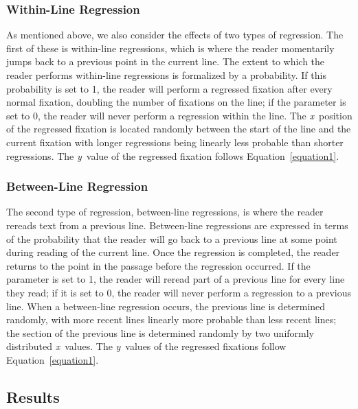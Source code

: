 \documentclass[doc,biblatex]{apa7}
\begin{document}
\subsubsection{Within-Line Regression}

As mentioned above, we also consider the effects of two types of regression. The first of these is within-line regressions, which is where the reader momentarily jumps back to a previous point in the current line. The extent to which the reader performs within-line regressions is formalized by a probability. If this probability is set to 1, the reader will perform a regressed fixation after every normal fixation, doubling the number of fixations on the line; if the parameter is set to 0, the reader will never perform a regression within the line. The \textit{x}~position of the regressed fixation is located randomly between the start of the line and the current fixation with longer regressions being linearly less probable than shorter regressions. The \textit{y}~value of the regressed fixation follows Equation~\ref{equation1}.

\subsubsection{Between-Line Regression}

The second type of regression, between-line regressions, is where the reader rereads text from a previous line. Between-line regressions are expressed in terms of the probability that the reader will go back to a previous line at some point during reading of the current line. Once the regression is completed, the reader returns to the point in the passage before the regression occurred. If the parameter is set to 1, the reader will reread part of a previous line for every line they read; if it is set to 0, the reader will never perform a regression to a previous line. When a between-line regression occurs, the previous line is determined randomly, with more recent lines linearly more probable than less recent lines; the section of the previous line is determined randomly by two uniformly distributed \textit{x}~values. The \textit{y}~values of the regressed fixations follow Equation~\ref{equation1}.

\subsection{Results}
\end{document}
